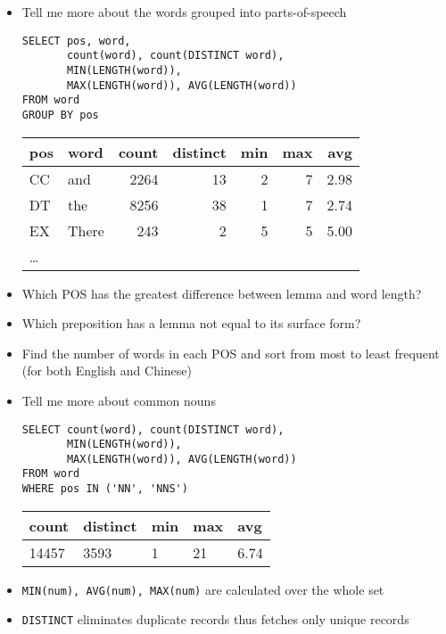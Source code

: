 \documentclass[a4paper,landscape,headrule,footrule,dvips]{foils}
\begin{document}
\begin{CJK}{UTF8}{min}
\begin{itemize}
\item Tell me more about the words grouped into parts-of-speech
\begin{verbatim}
SELECT pos, word,
       count(word), count(DISTINCT word),
       MIN(LENGTH(word)), 
       MAX(LENGTH(word)), AVG(LENGTH(word))
FROM word
GROUP BY pos
\end{verbatim}
  \begin{tabular}{llrrrrr}
    \textbf{pos} & \textbf{word} & \textbf{count} & \textbf{distinct}  
  & \textbf{min}  &  \textbf{max} & \textbf{avg} \\ \hline
  CC & and  & 2264 & 13 & 2 & 7 & 2.98 \\
  DT & the  & 8256 & 38 & 1 & 7 & 2.74 \\
  EX & There&  243 &  2 & 5 & 5 & 5.00  \\
\ldots
  \end{tabular}
\end{itemize}



\begin{itemize}
\item Which POS has the greatest difference between lemma and word length?
\item Which preposition has a lemma not equal to its surface form?
\item Find the number of words in each POS and sort from most to least
  frequent (for both English and Chinese)
\end{itemize}


\begin{itemize}
\item Tell me more about common nouns
\begin{verbatim}
SELECT count(word), count(DISTINCT word),
       MIN(LENGTH(word)), 
       MAX(LENGTH(word)), AVG(LENGTH(word))
FROM word
WHERE pos IN ('NN', 'NNS')
\end{verbatim}
  \begin{tabular}{lllll}
    \textbf{count}  & \textbf{distinct} &\textbf{min}  &  \textbf{max} & \textbf{avg} \\ \hline
    14457 & 3593 & 1 & 21 & 6.74
  \end{tabular}
\item  \texttt{MIN(num), AVG(num), MAX(num)} are calculated over the whole set
\item \texttt{DISTINCT} eliminates duplicate records thus fetches only unique records
\end{itemize}


\end{CJK}
\end{document}
